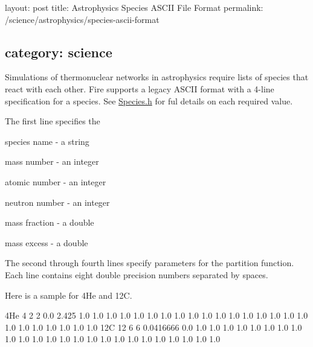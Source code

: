 

 layout\+: post title\+: Astrophysics Species A\+S\+C\+II File Format permalink\+: /science/astrophysics/species-\/ascii-\/format \subsection*{category\+: science }

Simulations of thermonuclear networks in astrophysics require lists of species that react with each other. Fire supports a legacy A\+S\+C\+II format with a 4-\/line specification for a species. See \hyperlink{a00299_source}{Species.\+h} for ful details on each required value.

The first line specifies the


\begin{DoxyItemize}
\item species name -\/ a string
\item mass number -\/ an integer
\item atomic number -\/ an integer
\item neutron number -\/ an integer
\item mass fraction -\/ a double
\item mass excess -\/ a double
\end{DoxyItemize}

The second through fourth lines specify parameters for the partition function. Each line contains eight double precision numbers separated by spaces.

Here is a sample for 4\+He and 12C.


\begin{DoxyCode}
4He 4 2 2 0.0 2.425
1.0 1.0 1.0 1.0 1.0 1.0 1.0 1.0
1.0 1.0 1.0 1.0 1.0 1.0 1.0 1.0
1.0 1.0 1.0 1.0 1.0 1.0 1.0 1.0
12C 12 6 6 0.0416666 0.0
1.0 1.0 1.0 1.0 1.0 1.0 1.0 1.0
1.0 1.0 1.0 1.0 1.0 1.0 1.0 1.0
1.0 1.0 1.0 1.0 1.0 1.0 1.0 1.0
\end{DoxyCode}
 